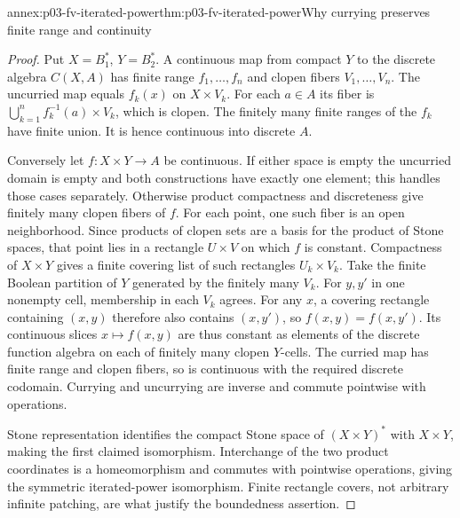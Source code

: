\begin{annexitem}{annex:p03-fv-iterated-power}{thm:p03-fv-iterated-power}{Why currying preserves finite range and continuity}
\begin{proof}
Put \(X=B_1^*\), \(Y=B_2^*\). A continuous map from compact
\(Y\) to the discrete algebra \(C(X,A)\) has finite range
\(f_1,\ldots,f_n\) and clopen fibers \(V_1,\ldots,V_n\).
The uncurried map equals \(f_k(x)\) on \(X\times V_k\).
For each \(a\in A\) its fiber is
\(\bigcup_{k=1}^n f_k^{-1}(a)\times V_k\), which is clopen.
The finitely many finite ranges of the \(f_k\) have finite union.
It is hence continuous into discrete \(A\).

Conversely let \(f:X\times Y\to A\) be continuous. If either space
is empty the uncurried domain is empty and both constructions have exactly
one element; this handles those cases separately. Otherwise product
compactness and discreteness give finitely many clopen fibers of \(f\).
For each point, one such fiber is an open neighborhood. Since products of
clopen sets are a basis for the product of Stone spaces, that point lies
in a rectangle \(U\times V\) on which \(f\) is constant. Compactness
of \(X\times Y\) gives a finite covering list of such rectangles
\(U_k\times V_k\). Take the finite Boolean partition of \(Y\)
generated by the finitely many \(V_k\). For \(y,y'\) in one nonempty
cell, membership in each \(V_k\) agrees. For any \(x\), a covering
rectangle containing \((x,y)\) therefore also contains \((x,y')\),
so \(f(x,y)=f(x,y')\). Its continuous slices \(x\mapsto f(x,y)\)
are thus constant as elements of the discrete function algebra on each
of finitely many clopen \(Y\)-cells. The curried map has finite range
and clopen fibers, so is continuous with the required discrete codomain.
Currying and uncurrying are inverse and commute pointwise with operations.

Stone representation identifies the compact Stone space of
\((X\times Y)^*\) with \(X\times Y\), making the first claimed
isomorphism. Interchange of the two product coordinates is a homeomorphism
and commutes with pointwise operations, giving the symmetric iterated-power
isomorphism. Finite rectangle covers, not arbitrary infinite patching, are
what justify the boundedness assertion.
\end{proof}
\end{annexitem}


